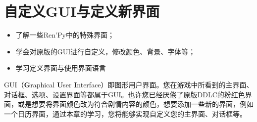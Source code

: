 \documentclass[../../Main.tex]{subfiles}
\begin{document}
\chapter{自定义GUI与定义新界面}
\begin{ChapterGoals}
    \begin{itemize}
        \item 了解一些Ren'Py中的特殊界面；
        \item 学会对原版的GUI进行自定义，修改颜色、背景、字体等；
        \item 学习定义界面与使用界面语言
    \end{itemize}
\end{ChapterGoals}
GUI（\textbf{G}raphical \textbf{U}ser \textbf{I}nterface）即图形用户界面。您在游戏中所看到的主界面、对话框、选项、设置界面等都属于GUI。也许您已经厌倦了原版DDLC的粉红色界面，或是想要将界面颜色改为符合剧情内容的颜色，想要添加一些新的界面，例如一个日历界面，通过本章的学习，您将能够实现自定义您的主界面、对话框等。



\end{document}
